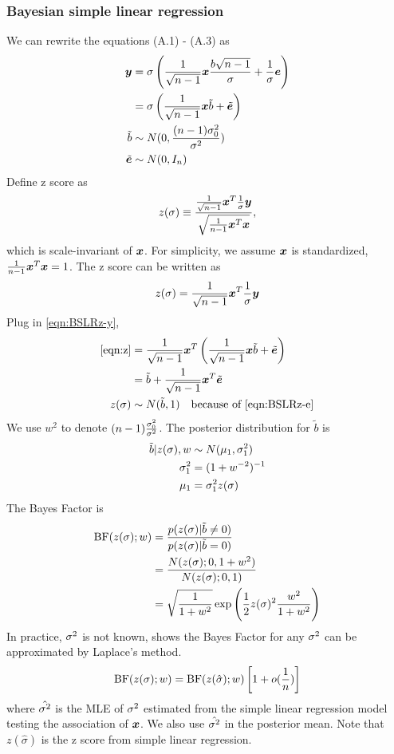 \subsubsection{Bayesian simple linear regression}
We can rewrite the equations (A.1) - (A.3) as
\begin{align}
\bm y &= \sigma\left( \frac{1}{\sqrt{n-1}} \bm x \frac{b\sqrt{n-1}}{\sigma} + \frac { 1}{\sigma} \bm e \right) \\
 &= \sigma\left( \frac{1}{\sqrt{n-1}} \bm x \tilde{b} + \tilde{\bm e} \right) \label{eqn:BSLRz-y}\\
\tilde{b} &\sim N(0, \frac{(n-1) \sigma^2_{0}}{\sigma^2}) \\
\tilde{\bm e} & \sim N(0,I_n) \label{eqn:BSLRz-e}
\end{align}
Define z score as 
\begin{equation}
    z(\sigma) \equiv \frac{\frac{1}{\sqrt{n-1}}\bm x^T \frac{1}{\sigma}\bm y}{ \sqrt{\frac{1}{n-1}\bm x^T\bm x}},
\end{equation}
which is scale-invariant of $\bm x$. For simplicity, we assume $\bm x$ is standardized, $\frac{1}{n-1}\bm x^T\bm x = 1$. The z score can be written as
\begin{equation}\label{eqn:z}
    z(\sigma) = \frac{1}{\sqrt{n-1}}\bm x^T \frac{1}{\sigma}\bm y
\end{equation}
Plug in \eqref{eqn:BSLRz-y},
\begin{align}
    \eqref{eqn:z} &= \frac{1}{\sqrt{n-1}}\bm x^T \left( \frac{1}{\sqrt{n-1}} \bm x \tilde{b} + \tilde{\bm e} \right) \label{eqn:BSLRz-z}\\
    &= \tilde{b} + \frac{1}{\sqrt{n-1}}\bm x^T\tilde{\bm e} \\
    z(\sigma) &\sim N(\tilde{b}, 1) \quad \text{because of \eqref{eqn:BSLRz-e}} \label{eqn:BSLRz-zdistr}
\end{align}
We use $w^2$ to denote $(n-1)\frac{\sigma^2_0}{\sigma^2}$. The posterior distribution for $\tilde{b}$ is
\begin{align}
    \tilde{b} | z(\sigma), w &\sim N(\mu_1, \sigma^2_1) \\
    \sigma^2_1 &= (1 + w^{-2})^{-1} \\
    \mu_1 &= \sigma^2_1 z(\sigma)
\end{align}
The Bayes Factor is 
\begin{align}
    \text{BF}(z(\sigma); w) &=  \frac{p(z(\sigma) | \tilde{b} \neq 0)}{p(z(\sigma) | \tilde{b} = 0)}\label{eqn:BSLRz-BF} \\
    &= \frac{N(z(\sigma); 0, 1+w^2)}{N(z(\sigma); 0, 1)} \\
    &= \sqrt{\frac{1}{1+w^2}} \exp\left( \frac{1}{2} z(\sigma)^2 \frac{w^2}{1+w^2} \right)
\end{align}
In practice, $\sigma^2$ is not known, \cite{wen2014bayesian} shows the Bayes Factor for any $\sigma^2$ can be approximated by Laplace's method.
\begin{equation}
    \text{BF}(z(\sigma); w) =  \text{BF}(z(\hat{\sigma}); w) \left[1+o(\frac{1}{n})\right]
\end{equation}
where $\hat{\sigma^2}$ is the MLE of $\sigma^2$ estimated from the simple linear regression model testing the association of $\bm x$. We also use $\hat{\sigma^2}$ in the posterior mean. Note that $z(\hat{\sigma})$ is the z score from simple linear regression.

